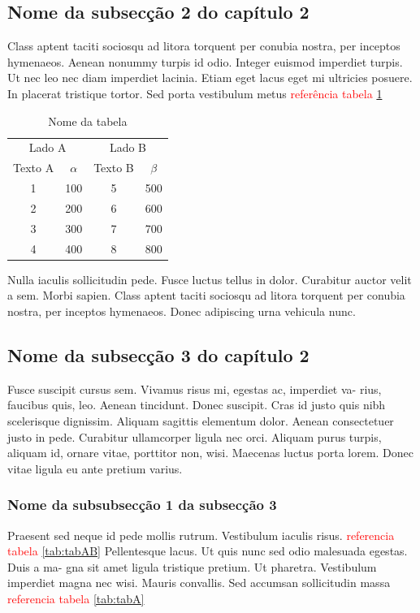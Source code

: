 \subsection{Nome da subsecção 2 do capítulo 2}
Class aptent taciti sociosqu ad litora torquent per conubia nostra, per inceptos hymenaeos. Aenean nonummy turpis id odio. Integer euismod imperdiet turpis. Ut nec leo nec diam imperdiet lacinia. Etiam eget lacus eget mi ultricies posuere. In placerat tristique tortor. Sed porta vestibulum metus \textcolor{red}{referência tabela} \ref{tab:tabMulti}

\begin{table}[ht]
    \centering
    \caption{Nome da tabela}
    \begin{tabular}{cccc}
        \hline
        \multicolumn{2}{c}{Lado A} & \multicolumn{2}{c}{Lado B}\\
        Texto A & $\alpha$ & Texto B & $\beta$ \\
        \hline
       1  & 100 & 5 & 500 \\
       2  & 200 & 6 & 600 \\
       3  & 300 & 7 & 700 \\
       4  & 400 & 8 & 800 \\
        \hline
    \end{tabular}
    \label{tab:tabMulti}
\end{table}

Nulla iaculis sollicitudin pede. Fusce luctus tellus in dolor. Curabitur auctor velit a sem. Morbi sapien. Class aptent taciti sociosqu ad litora torquent per conubia nostra, per inceptos hymenaeos. Donec adipiscing urna vehicula nunc.

\subsection{Nome da subsecção 3 do capítulo 2}
Fusce suscipit cursus sem. Vivamus risus mi, egestas ac, imperdiet va- rius, faucibus quis, leo. Aenean tincidunt. Donec suscipit. Cras id justo quis nibh scelerisque dignissim. Aliquam sagittis elementum dolor. Aenean consectetuer justo in pede. Curabitur ullamcorper ligula nec orci. Aliquam purus turpis, aliquam id, ornare vitae, porttitor non, wisi. Maecenas luctus porta lorem. Donec vitae ligula eu ante pretium varius.

\subsubsection{Nome da subsubsecção 1 da subsecção 3}
Praesent sed neque id pede mollis rutrum. Vestibulum iaculis risus. \textcolor{red}{referencia tabela} \ref{tab:tabAB} Pellentesque lacus. Ut quis nunc sed odio malesuada egestas. Duis a ma- gna sit amet ligula tristique pretium. Ut pharetra. Vestibulum imperdiet magna nec wisi. Mauris convallis. Sed accumsan sollicitudin massa \textcolor{red}{referencia tabela} \ref{tab:tabA}

